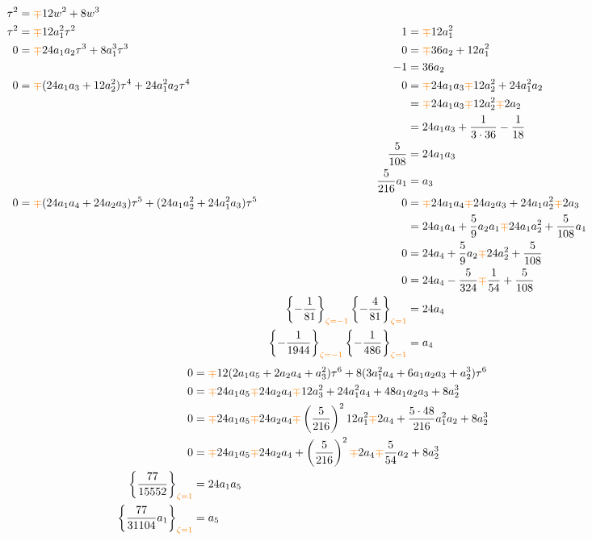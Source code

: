 \documentclass{article}
\begin{document}
\begin{align*}
\tau^2 & = \textcolor{orange}{\mp}12w^2 + 8w^3\\
\tau^2 & = \textcolor{orange}{\mp}12 a_1^2 \tau^2 & 1 & = \textcolor{orange}{\mp}12 a_1^2 \\
0 & = \textcolor{orange}{\mp}24 a_1 a_2 \tau^3 + 8a_1^3 \tau^3 & 0 & = \textcolor{orange}{\mp}36 a_2 + 12 a_1^2 \\
& & -1 & = 36 a_2 \\
0 & = \textcolor{orange}{\mp}(24a_1 a_3 + 12 a_2^2) \tau^4 + 24 a_1^2 a_2 \tau^4 & 0 & = \textcolor{orange}{\mp}24 a_1 a_3 \textcolor{orange}{\mp} 12 a_2^2 + 24 a_1^2 a_2 \\
& & & = \textcolor{orange}{\mp}24 a_1 a_3 \textcolor{orange}{\mp} 12 a_2^2 \textcolor{orange}{\mp} 2 a_2 \\
& & & = 24 a_1 a_3 + \frac{1}{3 \cdot 36} - \frac{1}{18} \\
& & \frac{5}{108} & = 24 a_1 a_3 \\
& & \frac{5}{216} a_1 & = a_3 \\
0 & = \textcolor{orange}{\mp}(24 a_1 a_4 + 24 a_2 a_3) \tau^5 + (24 a_1 a_2^2 + 24 a_1^2 a_3) \tau^5 & 0 & = \textcolor{orange}{\mp}24 a_1 a_4 \textcolor{orange}{\mp} 24 a_2 a_3 + 24 a_1 a_2^2 \textcolor{orange}{\mp} 2 a_3 \\
& & & = 24 a_1 a_4 + \frac{5}{9} a_2 a_1 \textcolor{orange}{\mp} 24 a_1 a_2^2 + \frac{5}{108} a_1 \\
& & 0 & = 24 a_4 + \frac{5}{9} a_2 \textcolor{orange}{\mp} 24 a_2^2 + \frac{5}{108} \\
& & 0 & = 24 a_4 - \frac{5}{324} \textcolor{orange}{\mp} \frac{1}{54} + \frac{5}{108} \\
& & \left\{ -\frac{1}{81} \right\}_{\textcolor{orange}{\zeta = -1}} \left\{ -\frac{4}{81} \right\}_{\textcolor{orange}{\zeta = 1}} & = 24 a_4 \\
& & \left\{ -\frac{1}{1944} \right\}_{\textcolor{orange}{\zeta = -1}} \left\{ -\frac{1}{486} \right\}_{\textcolor{orange}{\zeta = 1}} & = a_4
\end{align*}
\begin{align*}
0 & = \textcolor{orange}{\mp}12(2 a_1 a_5 + 2 a_2 a_4 + a_3^2) \tau^6 + 8(3 a_1^2 a_4 + 6 a_1 a_2 a_3 + a_2^3) \tau^6 \\
0 & = \textcolor{orange}{\mp}24 a_1 a_5 \textcolor{orange}{\mp} 24 a_2 a_4 \textcolor{orange}{\mp} 12 a_3^2 + 24 a_1^2 a_4 + 48 a_1 a_2 a_3 + 8 a_2^3\\
0 & = \textcolor{orange}{\mp}24 a_1 a_5 \textcolor{orange}{\mp} 24 a_2 a_4 \textcolor{orange}{\mp} \left(\frac{5}{216}\right)^2 12 a_1^2 \textcolor{orange}{\mp} 2 a_4 + \frac{5 \cdot 48}{216} a_1^2 a_2 + 8 a_2^3 \\
0 & = \textcolor{orange}{\mp}24 a_1 a_5 \textcolor{orange}{\mp} 24 a_2 a_4 + \left(\frac{5}{216}\right)^2 \textcolor{orange}{\mp} 2 a_4 \textcolor{orange}{\mp} \frac{5}{54} a_2 + 8 a_2^3 \\
\left\{ \frac{77}{15552} \right\}_{\textcolor{orange}{\zeta = 1}} & = 24 a_1 a_5 \\
\left\{ \frac{77}{31104} a_1 \right\}_{\textcolor{orange}{\zeta = 1}} & = a_5
\end{align*}
\end{document}
